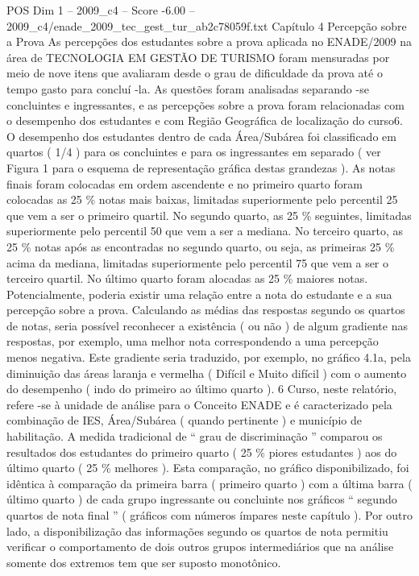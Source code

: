 \begin{textsample}{POS Dim 1 – 2009\_c4 – Score -6.00 – 2009\_c4/enade\_2009\_tec\_gest\_tur\_ab2c78059f.txt}  \label{ex:f1_pos_411}
Capítulo 4 Percepção sobre a Prova As percepções dos estudantes sobre a prova aplicada no ENADE/2009 na área de TECNOLOGIA EM GESTÃO DE TURISMO foram mensuradas por meio de nove itens que avaliaram desde o grau de dificuldade da prova até o tempo gasto para concluí -la.
As questões foram analisadas separando -se concluintes e ingressantes, e as percepções sobre a prova foram relacionadas com o desempenho dos estudantes e com Região Geográfica de localização do curso6.
O desempenho dos estudantes dentro de cada Área/Subárea foi classificado em quartos ( 1/4 ) para os concluintes e para os ingressantes em separado ( ver Figura 1 para o esquema de representação gráfica destas grandezas ).
As notas finais foram colocadas em ordem ascendente e no primeiro quarto foram colocadas as 25 \% notas mais baixas, limitadas superiormente pelo percentil 25 que vem a ser o primeiro quartil.
No segundo quarto, as 25 \% seguintes, limitadas superiormente pelo percentil 50 que vem a ser a mediana.
No terceiro quarto, as 25 \% notas após as encontradas no segundo quarto, ou seja, as primeiras 25 \% acima da mediana, limitadas superiormente pelo percentil 75 que vem a ser o terceiro quartil.
No último quarto foram alocadas as 25 \% maiores notas.
Potencialmente, poderia existir uma relação entre a nota do estudante e a sua percepção sobre a prova.
Calculando as médias das respostas segundo os quartos de notas, seria possível reconhecer a existência ( ou não ) de algum gradiente nas respostas, por exemplo, uma melhor nota correspondendo a uma percepção menos negativa.
Este gradiente seria traduzido, por exemplo, no gráfico 4.1a, pela diminuição das áreas laranja e vermelha ( Difícil e Muito difícil ) com o aumento do desempenho ( indo do primeiro ao último quarto ). 6 Curso, neste relatório, refere -se à unidade de análise para o Conceito ENADE e é caracterizado pela combinação de IES, Área/Subárea ( quando pertinente ) e município de habilitação.
A medida tradicional de “ grau de discriminação ” comparou os resultados dos estudantes do primeiro quarto ( 25 \% piores estudantes ) aos do último quarto ( 25 \% melhores ).
Esta comparação, no gráfico disponibilizado, foi idêntica à comparação da primeira barra ( primeiro quarto ) com a última barra ( último quarto ) de cada grupo ingressante ou concluinte nos gráficos “ segundo quartos de nota final ” ( gráficos com números ímpares neste capítulo ).
Por outro lado, a disponibilização das informações segundo os quartos de nota permitiu verificar o comportamento de dois outros grupos intermediários que na análise somente dos extremos tem que ser suposto monotônico.

\end{textsample}
